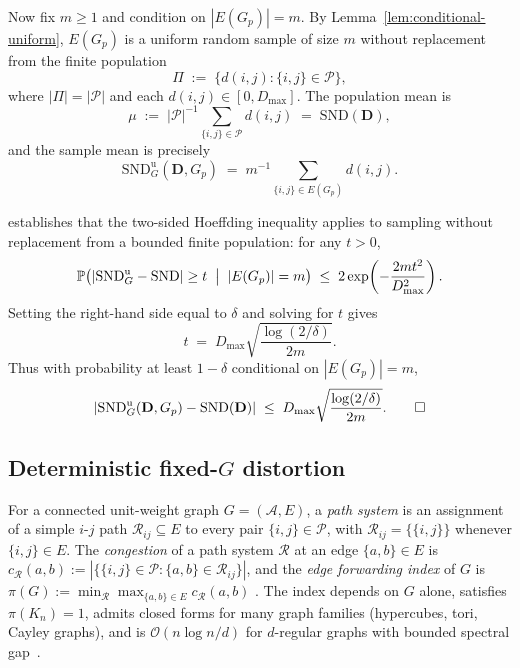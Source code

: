 \documentclass{article}
\theoremstyle{plain}
\theoremstyle{definition}
\theoremstyle{remark}
\newcommand{\Prob}{\mathbb{P}}
\newcommand{\Agents}{\mathcal{A}}        %
\newcommand{\Pairs}{\mathcal{P}}         %
\newcommand{\SND}{\ensuremath{\mathrm{SND}}}
\newcommand{\SNDG}{\mathrm{SND}_{G}}
\newcommand{\abs}[1]{\left\lvert #1 \right\rvert}
\begin{document}
Now fix $m \geq 1$ and condition on $|E(G_p)| = m$. By
Lemma~\ref{lem:conditional-uniform}, $E(G_p)$ is a uniform random sample
of size $m$ without replacement from the finite population
\[
\Pi \;:=\; \bigl\{ d(i,j) : \{i,j\} \in \Pairs \bigr\},
\]
where $|\Pi| = |\Pairs|$ and each $d(i,j) \in [0, D_{\max}]$. The
population mean is
\[
\mu \;:=\; |\Pairs|^{-1} \sum_{\{i,j\} \in \Pairs} d(i,j) \;=\; \SND(\mathbf{D}),
\]
and the sample mean is precisely
\[
\SNDG^{\mathrm{u}}(\mathbf{D}, G_p) \;=\; m^{-1} \sum_{\{i,j\} \in E(G_p)} d(i,j).
\]

\citet[Section 6, Theorem 4]{hoeffding1963probability} establishes that
the two-sided Hoeffding inequality applies to sampling without
replacement from a bounded finite population: for any $t > 0$,
\begin{equation}
\label{eq:hoeff-wor}
\Prob\bigl(\abs{\SNDG^{\mathrm{u}} - \SND} \geq t \;\bigm|\; |E(G_p)| = m\bigr)
\;\leq\; 2\exp\!\left(- \frac{2 m t^2}{D_{\max}^2}\right).
\end{equation}
Setting the right-hand side equal to $\delta$ and solving for $t$ gives
\[
t \;=\; D_{\max}\sqrt{\frac{\log(2/\delta)}{2m}}.
\]
Thus with probability at least $1 - \delta$ conditional on $|E(G_p)| = m$,
\[
\abs{\SNDG^{\mathrm{u}}(\mathbf{D}, G_p) - \SND(\mathbf{D})}
\;\leq\; D_{\max}\sqrt{\frac{\log(2/\delta)}{2m}}. \qed
\]

\subsection*{Deterministic fixed-$G$ distortion}
\label{app:distortion}

For a connected unit-weight graph $G=(\Agents,E)$, a \emph{path system}
is an assignment of a simple $i$-$j$ path $\mathcal{R}_{ij}\subseteq E$
to every pair $\{i,j\}\in\Pairs$, with
$\mathcal{R}_{ij}=\{\{i,j\}\}$ whenever $\{i,j\}\in E$. The
\emph{congestion} of a path system $\mathcal{R}$ at an edge
$\{a,b\}\in E$ is
$c_{\mathcal{R}}(a,b):=\abs{\{\{i,j\}\in\Pairs :
\{a,b\}\in\mathcal{R}_{ij}\}}$, and the \emph{edge forwarding index} of
$G$ is
$\pi(G):=\min_{\mathcal{R}} \max_{\{a,b\}\in E} c_{\mathcal{R}}(a,b)$
\citep{chung1987forwarding,heydemann1989forwarding}. The index depends
on $G$ alone, satisfies $\pi(K_n)=1$, admits closed forms for many
graph families (hypercubes, tori, Cayley graphs), and is
$\mathcal{O}(n\log n / d)$ for $d$-regular graphs with bounded spectral
gap~\citep{leighton1999multicommodity}.
\end{document}

